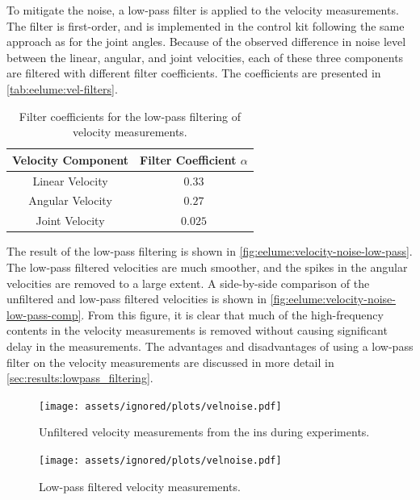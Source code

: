 To mitigate the noise, a low-pass filter is applied to the velocity measurements.
The filter is first-order, and is implemented in the control kit following the
same approach as for the joint angles. Because of the observed difference in
noise level between the linear, angular, and joint velocities, each of these
three components are filtered with different filter coefficients. The coefficients
are presented in \autoref{tab:eelume:vel-filters}.

\begin{table}[h]
    \centering
    \begin{tabular}{|c|c|}
        \hline
        Velocity Component & Filter Coefficient \(\alpha\) \\ \hline \hline
        Linear Velocity & \(0.33\) \\ \hline
        Angular Velocity & \(0.27\) \\ \hline
        Joint Velocity & \(0.025\) \\ \hline
        \hline
    \end{tabular}
    \caption{Filter coefficients for the low-pass filtering of velocity measurements.}
    \label{tab:eelume:vel-filters}
\end{table}

The result of the low-pass filtering is shown in \autoref{fig:eelume:velocity-noise-low-pass}.
The low-pass filtered velocities are much smoother, and the spikes in the angular
velocities are removed to a large extent. A side-by-side comparison of the unfiltered
and low-pass filtered velocities is shown in \autoref{fig:eelume:velocity-noise-low-pass-comp}.
From this figure, it is clear that much of the high-frequency contents in the velocity measurements
is removed without causing significant delay in the measurements. The advantages and disadvantages
of using a low-pass filter on the velocity measurements are discussed in more detail in \autoref{sec:results:lowpass_filtering}.

\begin{figure}[h!]
    \centering
    \texttt{[image: assets/ignored/plots/velnoise.pdf]}
    \caption{Unfiltered velocity measurements from the \gls{ins} during experiments.}
    \label{fig:eelume:velocity-noise}
\end{figure}

\begin{figure}[h!]
    \centering
    \texttt{[image: assets/ignored/plots/velnoise.pdf]}
    \caption{Low-pass filtered velocity measurements.}
    \label{fig:eelume:velocity-noise-low-pass}
\end{figure}

